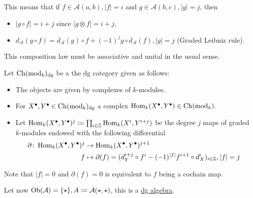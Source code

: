 \begin{rmk}
	This means that if $ f \in \mathcal{ A } ( a , b ) , \lvert f \rvert = i $ and $ g \in \mathcal{ A } ( b , c ), \lvert g \rvert = j $, then
	\begin{itemize}
		\item 
		$ \lvert g \circ f \rvert = i + j $ since $ \lvert g \otimes f \rvert = i + j $,
		
		\item 
		$ d_{ \mathcal{ A } } ( g \circ f ) = d_{ \mathcal{ A } } ( g ) \circ f + ( - 1 )^j g \circ d_{ \mathcal{A} } ( f ), \lvert g \rvert = j $ (Graded Leibniz rule).
	\end{itemize}
	This composition law must be associative and unital in the usual sense.
\end{rmk}

\begin{exmp}
	Let $ \operatorname{Ch} ( \operatorname{mod}_k )_{ \operatorname{dg} } $ be a the dg category given as follows:
	\begin{itemize}
		\item 
		The objects are given by complexes of $ k $-modules.
		
		\item 
		For $ X^\bullet , Y^\bullet \in \operatorname{Ch} ( \operatorname{mod}_k )_{ \operatorname{dg} } $ a complex $ \operatorname{Hom}_k ( X^\bullet , Y^\bullet ) \in \operatorname{Ch} ( \operatorname{mod}_k ) .$
		
		\item 
		Let $ \operatorname{Hom}_k ( X^\bullet , Y^\bullet )^j \coloneqq \prod_{ i \in \mathbb{ Z } } \operatorname{Hom}_k ( X^i , Y^{ i + j } ) $ be the degree $ j $ maps of graded $ k $-modules endowed with the following differential
		\begin{align*}
			\partial \colon \operatorname{Hom}_k ( X^\bullet , Y^\bullet )^j
			&\to
			\operatorname{Hom}_k ( X^\bullet , Y^\bullet )^{ j + 1 }
			\\
			f
			&\mapsto
			\partial ( f ) 
			=
			( d_Y^{ i + j } \circ f^i - ( - 1 )^{ \lvert f \rvert } f^{ i + 1 } \circ d_X^i )_{ i \in \mathbb{ Z } }, \lvert f \rvert = j 
		\end{align*} 
	\end{itemize}
	Note that $ \lvert f \rvert = 0 $ and $ \partial ( f ) = 0 $ is equivalent to $ f $ being a cochain map.
\end{exmp}

\begin{exmp}		
	Let now $ \operatorname{Ob} ( \mathcal{ A } ) = \{ \star \}, A \coloneqq \mathcal{ A } ( \star, \star ) $, this is a \underline{dg algebra}.
\end{exmp}

